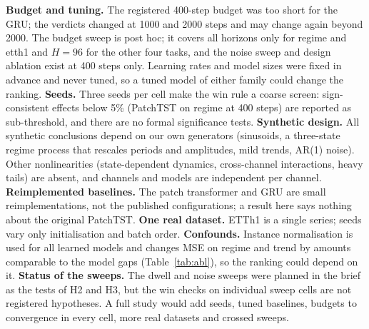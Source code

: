 \textbf{Budget and tuning.} The registered 400-step budget was too short for the GRU; the verdicts changed at 1000 and 2000 steps and may change again beyond 2000. The budget sweep is post hoc; it covers all horizons only for regime and etth1 and $H=96$ for the other four tasks, and the noise sweep and design ablation exist at 400 steps only. Learning rates and model sizes were fixed in advance and never tuned, so a tuned model of either family could change the ranking. \textbf{Seeds.} Three seeds per cell make the win rule a coarse screen: sign-consistent effects below 5\% (PatchTST on regime at 400 steps) are reported as sub-threshold, and there are no formal significance tests. \textbf{Synthetic design.} All synthetic conclusions depend on our own generators (sinusoids, a three-state regime process that rescales periods and amplitudes, mild trends, AR(1) noise). Other nonlinearities (state-dependent dynamics, cross-channel interactions, heavy tails) are absent, and channels and models are independent per channel. \textbf{Reimplemented baselines.} The patch transformer and GRU are small reimplementations, not the published configurations; a result here says nothing about the original PatchTST. \textbf{One real dataset.} ETTh1 is a single series; seeds vary only initialisation and batch order. \textbf{Confounds.} Instance normalisation is used for all learned models and changes MSE on regime and trend by amounts comparable to the model gaps (Table~\ref{tab:abl}), so the ranking could depend on it. \textbf{Status of the sweeps.} The dwell and noise sweeps were planned in the brief as the tests of H2 and H3, but the win checks on individual sweep cells are not registered hypotheses. A full study would add seeds, tuned baselines, budgets to convergence in every cell, more real datasets and crossed sweeps.
